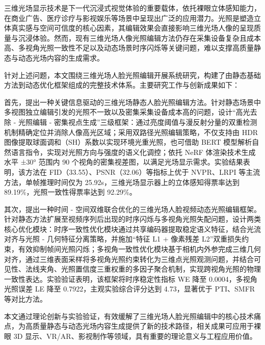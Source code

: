 \begin{cnabstract}
    三维光场显示技术是下一代沉浸式视觉体验的重要载体，依托裸眼立体感知能力，在商业广告、医疗诊疗与影视娱乐等场景中呈现出广泛的应用潜力。光照是塑造立体真实感与空间可信度的核心因素，其编辑效果会直接影响三维光场人像的呈现质量与沉浸体验。然而，现有三维光场人像光照编辑方法仍存在采集设备复杂且成本高、多视角光照一致性不足以及动态场景时序闪烁等关键问题，难以支撑高质量静态与动态光场内容的生成需求。
    
针对上述问题，本文围绕三维光场人脸光照编辑开展系统研究，构建了由静态基础方法到动态优化框架组成的完整技术体系。主要研究工作与创新成果如下：

首先，提出一种关键信息驱动的三维光场静态人脸光照编辑方法。针对静态场景中多视图独立编辑引发的光照不一致以及密集采集设备成本高的问题，设计“高光去除 - 光照编辑 - 密集视点生成”三级框架：通过亮度阈值与漫反射分量的双重检测机制精确定位并消除人像高光区域；采用双路径光照编辑策略，不仅支持由 HDR 图像提取球面调和（SH）系数以实现环境光重光照，也可借助 BERT 模型解析自然语言指令，实现对光照方向与强度的语义化调控；依托 NeRF 体渲染技术生成水平 ±30° 范围内 90 个视角的密集视差图，以满足光场显示需求。实验结果表明，该方法在 FID（33.55）、PSNR（32.06）等指标上优于 NVPR、LRPI 等主流方法，单帧推理时间仅为 25.92s，三维光场显示器上的立体感知得票率达到 89.19\%，光照一致性得票率达到 92.29\%。

其次，提出一种时间 - 空间双维联合优化的三维光场人脸视频动态光照编辑框架。针对静态方法扩展至视频序列后出现的时序闪烁与多视角光照失配问题，设计两类核心优化模块：时序一致性优化模块通过共享编码器提取稳定语义特征，结合光流对齐与光照 - 几何特征分离策略，并施加“特征 L1 + 像素残差 L2”双重损失约束，有效抑制帧间光照闪烁；多视角一致性优化模块基于相机内外参完成三维几何对齐，通过三维表面采样将多视角光照约束转化为三维点光照观测问题，并结合可见性、法线夹角、光照置信度三重权重的多因子聚合机制，实现跨视角光照的物理一致性表达。实验验证表明，该框架将时序稳定性指标 WE 降至 0.0004，多视角光照误差 LE 降至 0.7922，主观实验综合评分达到 4.73，显著优于 PTI、SMFR 等对比方法。

本文通过理论创新与实验验证，有效缓解了三维光场人脸光照编辑中的核心技术痛点，为高质量静态与动态光场内容生成提供了新的技术路径，相关成果可应用于裸眼 3D 显示、VR/AR、影视制作等领域，具有重要的理论意义与工程应用价值。

\end{cnabstract}
